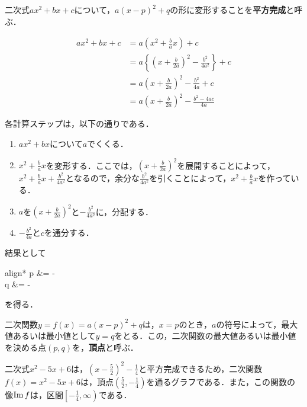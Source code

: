 \begin{definition}[平方完成]
	二次式$ax^2+bx+c$について，$a(x-p)^2+q$の形に変形することを\textbf{平方完成}と呼ぶ．
\end{definition}
\begin{algorithm}
	\begin{align}
		ax^2+bx+c &= a\left(x^2+\frac{b}{a}x\right)+c \tag{1} \\
		&= a\left\{\left(x+\frac{b}{2a}\right)^2-\frac{b^2}{4a^2}\right\}+c \tag{2} \\
		&= a\left(x+\frac{b}{2a}\right)^2-\frac{b^2}{4a}+c \tag{3} \\
		&= a\left(x+\frac{b}{2a}\right)^2-\frac{b^2-4ac}{4a} \tag{4}
	\end{align}
	
	各計算ステップは，以下の通りである．
	\begin{enumerate}[(1)]
		\item $ax^2+bx$について$a$でくくる．
		\item $x^2+\frac{b}{a}x$を変形する．ここでは，$\left(x+\frac{b}{2a}\right)^2$を展開することによって，$x^2+\frac{b}{a}x+\frac{b^2}{4a^2}$となるので，余分な$\frac{b^2}{4a^2}$を引くことによって，$x^2+\frac{b}{a}x$を作っている．
		\item $a$を$\left(x+\frac{b}{2a}\right)^2$と$-\frac{b^2}{4a^2}$に，分配する．
		\item $-\frac{b^2}{4a}$と$c$を通分する．
	\end{enumerate}

	結果として
	\begin{empheq}[left=\empheqlbrace]{align*}
		p &= - \\
		q &= -
	\end{empheq}
	を得る．
\end{algorithm}
\begin{rem*}
	二次関数$y = f(x) = a(x-p)^2+q$は，$x = p$のとき，$a$の符号によって，最大値あるいは最小値として$y = q$をとる．この，二次関数の最大値あるいは最小値を決める点$(p, q)$を，\textbf{頂点}と呼ぶ．
\end{rem*}
\begin{example*}
	二次式$x^2-5x+6$は，$\left(x-\frac{5}{2}\right)^2-\frac{1}{4}$と平方完成できるため，二次関数$f(x) = x^2-5x+6$は，頂点$\left(\frac{5}{2}, -\frac{1}{4}\right)$を通るグラフである．また，この関数の像$\operatorname{Im} f$は，区間$\left[-\frac{1}{4}, \infty\right)$である．
\end{example*}

